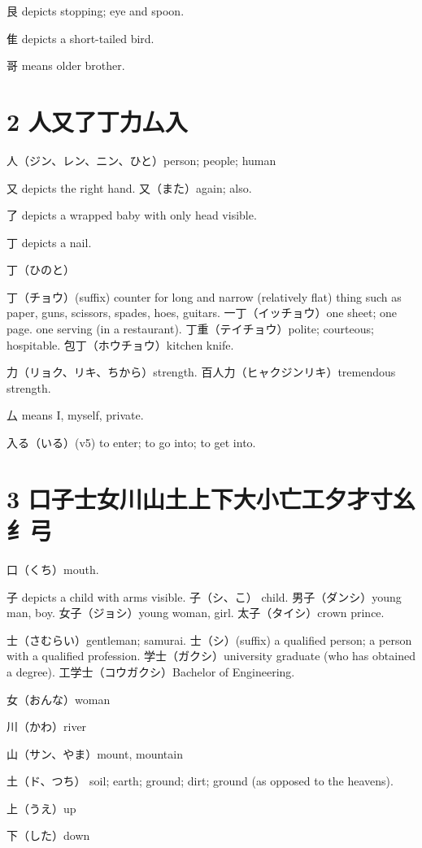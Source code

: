 艮 depicts stopping; eye and spoon.

隹 depicts a short-tailed bird.

哥 means older brother.

\section{2 人又了丁力厶入}

人（ジン、レン、ニン、ひと）person; people; human

又 depicts the right hand.
又（また）again; also.

了 depicts a wrapped baby with only head visible.

丁 depicts a nail.

丁（ひのと）

丁（チョウ）(suffix)
counter for long and narrow (relatively flat) thing
such as paper, guns, scissors, spades, hoes, guitars.
一丁（イッチョウ）one sheet; one page.
one serving (in a restaurant).
丁重（テイチョウ）polite; courteous; hospitable.
包丁（ホウチョウ）kitchen knife.

力（リョク、リキ、ちから）strength.
百人力（ヒャクジンリキ）tremendous strength.

厶 means I, myself, private.

入る（いる）(v5)
to enter; to go into; to get into.

\section{3 口子士女川山土上下大小亡工夕才寸幺纟弓}

口（くち）mouth.

子 depicts a child with arms visible.
子（シ、こ） child.
男子（ダンシ）young man, boy.
女子（ジョシ）young woman, girl.
太子（タイシ）crown prince.

士（さむらい）gentleman; samurai.
士（シ）(suffix)
a qualified person;
a person with a qualified profession.
学士（ガクシ）university graduate (who has obtained a degree).
工学士（コウガクシ）Bachelor of Engineering.

女（おんな）woman

川（かわ）river

山（サン、やま）mount, mountain

土（ド、つち）
soil; earth; ground; dirt; ground (as opposed to the heavens).

上（うえ）up

下（した）down

